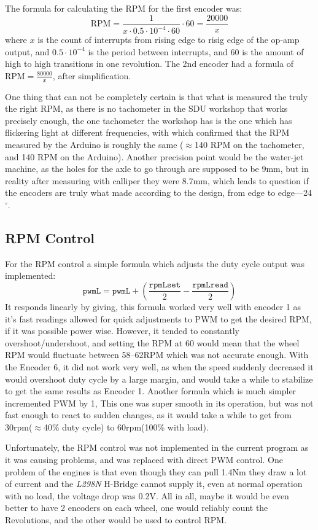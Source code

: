\documentclass[11pt]{article}
\begin{document}
The formula for calculating the RPM for the first encoder was:
$$\text{RPM}=\frac{1}{x\cdot0.5\cdot10^{-4}\cdot60}\cdot60=\frac{20000}{x}$$
where $x$ is the count of interrupts from rising edge to risig edge of the op-amp output, and $0.5\cdot10^{-4}$ is the period between interrupts, and $60$ is the amount of high to high transitions in one revolution. The 2nd encoder had a formula of $\text{RPM}=\frac{80000}{x}$, after simplification.


One thing that can not be completely certain is that what is measured the truly the right RPM, as there is no tachometer in the SDU workshop that works precisely enough, the one tachometer the workshop has is the one which has flickering light at different frequencies, with which confirmed that the RPM measured by the Arduino is roughly the same ($\approx$140 RPM on the tachometer, and 140 RPM on the Arduino). Another precision point would be the water-jet machine, as the holes for the axle to go through are supposed to be 9mm, but in reality after measuring with calliper they were 8.7mm, which leads to question if the encoders are truly what made according to the design, from edge to edge---24$^\circ$.

\subsection*{RPM Control}
For the RPM control a simple formula which adjusts the duty cycle output was implemented:
$$\texttt{pwmL}=\texttt{pwmL}+(\frac{\texttt{rpmLset}}{2}-\frac{\texttt{rpmLread}}{2})$$
It responds linearly by giving, this formula worked very well with encoder 1 as it's fast readings allowed for quick adjustments to PWM to get the desired RPM, if it was possible power wise. However, it tended to constantly overshoot/undershoot, and setting the RPM at 60 would mean that the wheel RPM would fluctuate between 58--62RPM which was not accurate enough. With the Encoder 6, it did not work very well, as when the speed suddenly decreased it would overshoot duty cycle by a large margin, and would take a while to stabilize to get the same results as Encoder 1.
Another formula which is much simpler incremented PWM by 1, This one was super smooth in its operation, but was not fast enough to react to sudden changes, as it would take a while to get from 30rpm($\approx$40\% duty cycle) to 60rpm(100\% with load).


Unfortunately, the RPM control was not implemented in the current program as it was causing problems, and was replaced with direct PWM control. One problem of the engines is that even though they can pull 1.4Nm they draw a lot of current and the \textit{L298N} H-Bridge cannot supply it, even at normal operation with no load, the voltage drop was 0.2V. All in all, maybe it would be even better to have 2 encoders on each wheel, one would reliably count the Revolutions, and the other would be used to control RPM.
\end{document}
